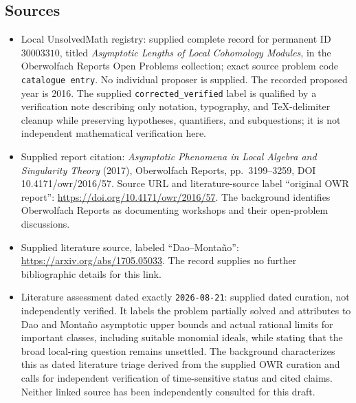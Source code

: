 \documentclass[11pt]{article}
\begin{document}
\subsection{Sources}
\begin{itemize}
\item Local UnsolvedMath registry: supplied complete record for permanent ID \(30003310\), titled \emph{Asymptotic Lengths of Local Cohomology Modules}, in the Oberwolfach Reports Open Problems collection; exact source problem code \texttt{catalogue entry}. No individual proposer is supplied. The recorded proposed year is 2016. The supplied \texttt{corrected\_verified} label is qualified by a verification note describing only notation, typography, and TeX-delimiter cleanup while preserving hypotheses, quantifiers, and subquestions; it is not independent mathematical verification here.
\item Supplied report citation: \emph{Asymptotic Phenomena in Local Algebra and Singularity Theory} (2017), Oberwolfach Reports, pp.\ 3199--3259, DOI 10.4171/owr/2016/57. Source URL and literature-source label ``original OWR report'': \url{https://doi.org/10.4171/owr/2016/57}. The background identifies Oberwolfach Reports as documenting workshops and their open-problem discussions.
\item Supplied literature source, labeled ``Dao--Montaño'': \url{https://arxiv.org/abs/1705.05033}. The record supplies no further bibliographic details for this link.
\item Literature assessment dated exactly \texttt{2026-08-21}: supplied dated curation, not independently verified. It labels the problem partially solved and attributes to Dao and Montaño asymptotic upper bounds and actual rational limits for important classes, including suitable monomial ideals, while stating that the broad local-ring question remains unsettled. The background characterizes this as dated literature triage derived from the supplied OWR curation and calls for independent verification of time-sensitive status and cited claims. Neither linked source has been independently consulted for this draft.
\end{itemize}
\end{document}

